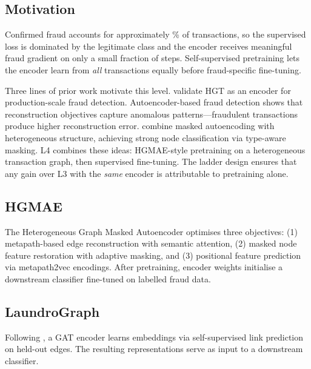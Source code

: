 \subsection{Motivation}
\label{sec:l4-motivation}

Confirmed fraud accounts for approximately \% of transactions, so the supervised loss is dominated by the legitimate class and the encoder receives meaningful fraud gradient on only a small fraction of steps. Self-supervised pretraining lets the encoder learn from \emph{all} transactions equally before fraud-specific fine-tuning.

Three lines of prior work motivate this level.
\citet{rao2022xfraud} validate HGT as an encoder for production-scale fraud detection.
Autoencoder-based fraud detection \citep{pumsirirat2018autoencoder, singh2024hetero} shows that reconstruction objectives capture anomalous patterns---fraudulent transactions produce higher reconstruction error.
\citet{tian2023hgmae} combine masked autoencoding with heterogeneous structure, achieving strong node classification via type-aware masking.
L4 combines these ideas: HGMAE-style pretraining on a heterogeneous transaction graph, then supervised fine-tuning. The ladder design ensures that any gain over L3 with the \emph{same} encoder is attributable to pretraining alone.

\subsection{HGMAE}

The Heterogeneous Graph Masked Autoencoder \citep{tian2023hgmae} optimises three objectives: (1) metapath-based edge reconstruction with semantic attention, (2) masked node feature restoration with adaptive masking, and (3) positional feature prediction via metapath2vec encodings. After pretraining, encoder weights initialise a downstream classifier fine-tuned on labelled fraud data.

\subsection{LaundroGraph}

Following \citet{cardoso2022laundrograph}, a GAT encoder learns embeddings via self-supervised link prediction on held-out edges. The resulting representations serve as input to a downstream classifier.


